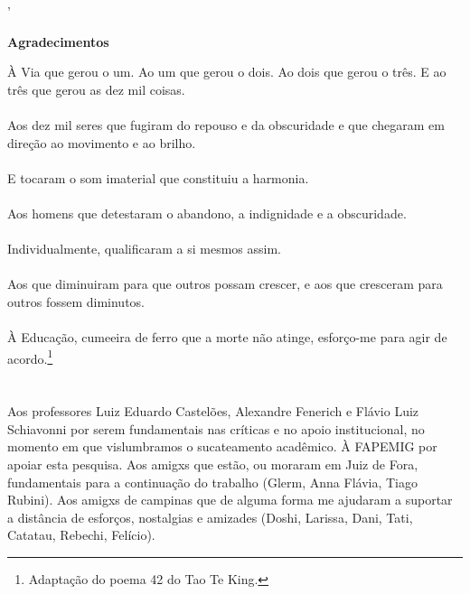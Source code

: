 \documentclass[
	12pt,				%
	openright,			%
	twoside,			%
	a4paper,			%
	english,			%
	french,				%
	spanish,			%
        italian,                        %
	brazil				%
	]{abntex2}
\begin{document}
'%
\newpage
\begin{flushright}
\huge{\textbf{Agradecimentos}}

\LARGE{À Via que gerou o um. Ao um que gerou o dois. Ao dois que gerou o três. E ao tr\^es que gerou as dez mil coisas.} \\
\ \\
\large{Aos dez mil seres que fugiram do repouso e da obscuridade e que chegaram em direção ao movimento e ao brilho.} \\
\ \\
\normalsize{E tocaram o som imaterial que constituiu a harmonia.} \\
\ \\
\small{Aos homens que detestaram o abandono, a indignidade e a obscuridade.} \\
\ \\
\footnotesize{Individualmente, qualificaram a si mesmos assim.} \\
\ \\
\scriptsize{Aos que diminuiram para que outros possam crescer, e aos que cresceram para outros fossem diminutos.} \\
\ \\
\tiny{À Educação, cumeeira de ferro que a morte não atinge, esforço-me para agir de acordo.\footnote{Adaptação do poema 42 do Tao Te King.}} \\
\ \\
\ \\
\small{Aos professores Luiz Eduardo Castelões, Alexandre Fenerich e Flávio Luiz Schiavonni por serem fundamentais nas críticas e no apoio institucional, no momento em que vislumbramos o sucateamento acadêmico. À FAPEMIG por apoiar esta pesquisa. Aos amigxs que estão, ou moraram em Juiz de Fora, fundamentais para a continuação do trabalho (Glerm, Anna Flávia, Tiago Rubini). Aos amigxs de campinas que de alguma forma me ajudaram a suportar a distância de esforços, nostalgias e amizades (Doshi, Larissa, Dani, Tati, Catatau, Rebechi, Felício).}
\end{flushright}
\end{document}
